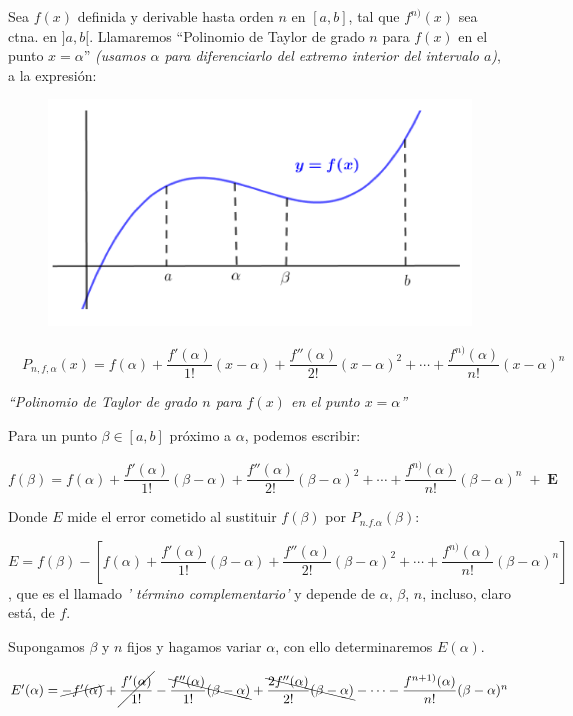 		\begin{multicols}{2}
		Sea $f(x)$ definida y derivable hasta orden $n$ en $[a,b]$, tal que $f^{n)}(x)$ sea ctna. en $]a,b[$. Llamaremos ``Polinomio de Taylor de grado $n$ para $f(x)$ en el punto $x=\alpha$'' \textit{(usamos $\alpha$ para diferenciarlo del extremo interior del intervalo $a$)}, a la expresión:
		\begin{figure}[H]
		\centering
		\includegraphics[width=.4\textwidth]{imagenes/imagenes06/T06IM03.png}
		\end{figure}
		\end{multicols}
		
	\begin{equation}
		\label{Taylor}
		\boxed{ \quad P_{n,f,\alpha}(x)=f(\alpha)+\dfrac {f'(\alpha)}{1!} (x-\alpha)+\dfrac {f''(\alpha)}{2!} (x-\alpha)^2+\cdots +\dfrac {f^{n)}(\alpha)}{n!} (x-\alpha)^n \quad}
	\end{equation}
	\centerline{\emph{``Polinomio de Taylor de grado $n$ para $f(x)$ en el punto $x=\alpha$''}}
	
	Para un punto $\beta \in [a,b]$ próximo a $\alpha$, podemos escribir:
	
	$ f(\beta)=f(\alpha)+\dfrac {f'(\alpha)}{1!} (\beta-\alpha)+\dfrac {f''(\alpha)}{2!} (\beta-\alpha)^2+\cdots +\dfrac {f^{n)}(\alpha)}{n!} (\beta-\alpha)^n \; + \; \textbf{E}$
	
	Donde $E$ mide el error cometido al sustituir $f(\beta)$ por $P_{n.f.\alpha}(\beta)$:
	
	$E=f(\beta)- \left[ f(\alpha)+\dfrac {f'(\alpha)}{1!} (\beta-\alpha)+\dfrac {f''(\alpha)}{2!} (\beta-\alpha)^2+\cdots +\dfrac {f^{n)}(\alpha)}{n!} (\beta-\alpha)^n   \right]$, que es el llamado \emph{' término complementario'} y depende de $\alpha$, $\beta$, $n$, incluso, claro está, de $f$.
	
	Supongamos $\beta$ y $n$ fijos y hagamos variar $\alpha$, con ello determinaremos $E(\alpha)$.
	
	$E'(\alpha)=\cancel{-f'(\alpha)}+\cancel{\dfrac{f'(\alpha)}{1!}}-\bcancel{\dfrac {f''(\alpha)}{1!}(\beta-\alpha)} +\bcancel{\dfrac {2f''(\alpha)}{2!}(\beta-\alpha)}-\cdots - \dfrac {f^{n+1)}(\alpha)}{n!}(\beta-\alpha)^n$
	
